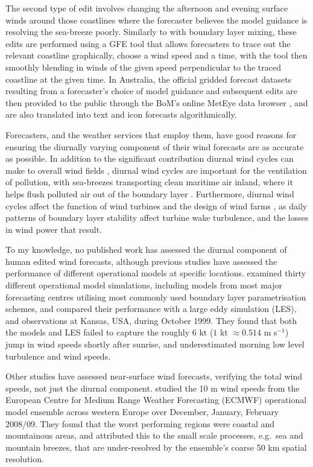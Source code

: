 \documentclass{ametsoc}
\begin{document}
The second type of edit involves changing the afternoon and evening surface winds around those coastlines where the forecaster believes the model guidance is resolving the sea-breeze poorly. Similarly to with boundary layer mixing, these edits are performed using a GFE tool that allows forecasters to trace out the relevant coastline graphically, choose a wind speed and a time, with the tool then smoothly blending in winds of the given speed perpendicular to the traced coastline at the given time. In Australia, the official gridded forecast datasets resulting from a forecaster's choice of model guidance and subsequent edits are then provided to the public through the BoM's online MetEye data browser \citep{bomMetEye19}, and are also translated into text and icon forecasts algorithmically. 

Forecasters, and the weather services that employ them, have good reasons for ensuring the diurnally varying component of their wind forecasts are as accurate as possible. In addition to the significant contribution diurnal wind cycles can make to overall wind fields \citep[e.g.][]{dai99}, diurnal wind cycles are important for the ventilation of pollution, with sea-breezes transporting clean maritime air inland, where it helps flush polluted air out of the boundary layer \citep{miller03, physick92}. Furthermore, diurnal wind cycles affect the function of wind turbines \citep{englberger18} and the design of wind farms \citep{abkar16}, as daily patterns of boundary layer stability affect turbine wake turbulence, and the losses in wind power that result.

To my knowledge, no published work has assessed the diurnal component of human edited wind forecasts, although previous studies have assessed the performance of different operational models at specific locations. \citet{svensson11} examined thirty different operational model simulations, including models from most major forecasting centres utilising most commonly used boundary layer parametrisation schemes, and compared their performance with a large eddy simulation (LES), and observations at Kansas, USA, during October 1999. They found that both the models and LES failed to capture the roughly $6$ kt ($1$ kt $\approx 0.514$ m s$^{-1}$) jump in wind speeds shortly after sunrise, and underestimated morning low level turbulence and wind speeds.

Other studies have assessed near-surface wind forecasts, verifying the total wind speeds, not just the diurnal component. \citet{pinson12} studied the 10 m wind speeds from the European Centre for Medium Range Weather Forecasting (ECMWF) operational model ensemble across western Europe over December, January, February 2008/09. They found that the worst performing regions were coastal and mountainous areas, and attributed this to the small scale processes, e.g.~sea and mountain breezes, that are under-resolved by the ensemble's coarse 50 km spatial resolution.
\end{document}
